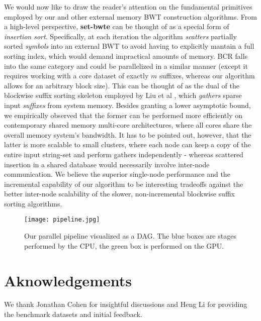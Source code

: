 \documentclass{acmsiggraph}
\begin{document}
We would now like to draw the reader's attention on the fundamental primitives employed by our and other external memory BWT construction algorithms.
From a high-level perspective, {\bf set-bwte} can be thought of as a special form of \emph{insertion sort}.
Specifically, at each iteration the algorithm \emph{scatters} partially sorted  \emph{symbols} into an external BWT to avoid having to explicitly mantain
a full sorting index, which would demand impractical amounts of memory.
BCR \cite{Bauer:2011} falls into the same category and could be parallelized in a similar manner (except it requires working with a core dataset of exactly $m$ suffixes,
whereas our algorithm allows for an arbitrary block size).
This can be thought of as the dual of the blockwise suffix sorting \cite{Karkkainen:2007} skeleton employed by Liu et al ,
which \emph{gathers} sparse input \emph{suffixes} from system memory.
Besides granting a lower asymptotic bound, we empirically observed that the former can be performed more efficiently on contemporary shared memory multi-core architectures,
where all cores share the overall memory system's bandwidth.
It has to be pointed out, however, that the latter is more scalable to small clusters, where each node can keep a copy of the entire input string-set and perform gathers
independently - whereas scattered insertion in a shared database would necessarily involve inter-node communication. We believe the superior single-node performance
and the incremental capability of our algorithm to be interesting tradeoffs against the better inter-node scalability of the slower, non-incremental blockwise suffix sorting
algorithms.

\begin{figure}
\begin{center}
 \texttt{[image: pipeline.jpg]}
 \caption{Our parallel pipeline visualized as a DAG. The blue boxes are stages performed by the CPU, the green box is performed on the GPU.}
\end{center}
\end{figure}

\section{Aknowledgements}

We thank Jonathan Cohen for insightful discussions and Heng Li for providing the benchmark datasets and initial feedback.



\end{document}
